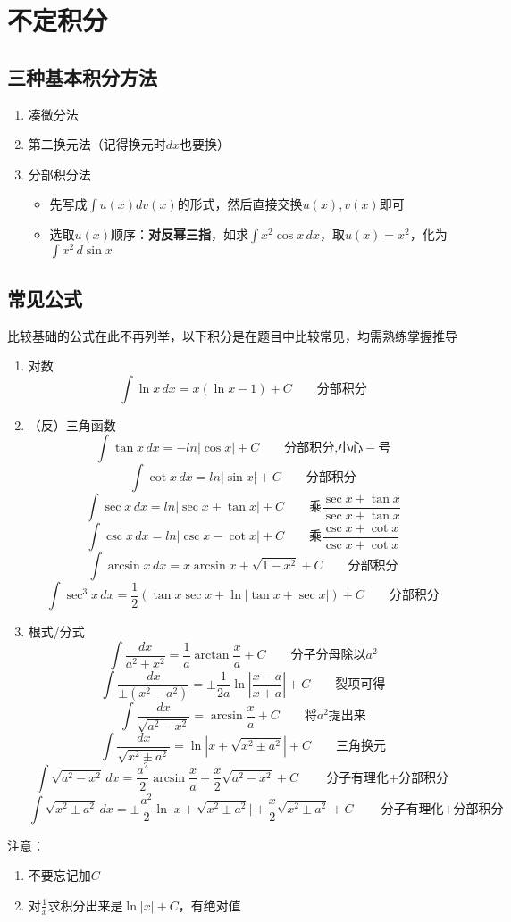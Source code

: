 \section{不定积分}
\subsection{三种基本积分方法}
\begin{enumerate}
	\item 凑微分法
	\item 第二换元法（记得换元时$dx$也要换）
	\item 分部积分法
	\begin{itemize}
		\item 先写成$\displaystyle\int u(x)dv(x)$的形式，然后直接交换$u(x),v(x)$即可
		\item 选取$u(x)$顺序：\textbf{对反幂三指}，如求$\displaystyle\int x^2\cos x\,dx$，取$u(x)=x^2$，化为$\displaystyle\int x^2\,d\sin x$
	\end{itemize}
\end{enumerate}

\subsection{常见公式}
比较基础的公式在此不再列举，以下积分是在题目中比较常见，均需熟练掌握推导
\begin{enumerate}
\item 对数
\[\int \ln x\,dx=x(\ln x-1)+C\qquad\mbox{分部积分}\]
\item （反）三角函数
\[\int \tan x\,dx=-ln|\cos x|+C\qquad\mbox{分部积分,小心}-\mbox{号}\]
\[\int \cot x\,dx=ln|\sin x|+C\qquad\mbox{分部积分}\]
\[\int \sec x\,dx=ln|\sec x+\tan x|+C\qquad\mbox{乘}\frac{\sec x+\tan x}{\sec x+\tan x}\]
\[\int \csc x\,dx=ln|\csc x-\cot x|+C\qquad\mbox{乘}\frac{\csc x+\cot x}{\csc x+\cot x}\]
\[\int \arcsin x\,dx=x\arcsin x+\sqrt{1-x^2}+C\qquad\mbox{分部积分}\]
\[\int \sec^3 x \, dx=\frac{1}{2} (\tan x \sec x+\ln |\tan x+\sec x|)+C\qquad\mbox{分部积分}\]
\item 根式/分式
\[\int \frac{dx}{a^2+x^2}=\frac{1}{a} \arctan\frac{x}{a}+C\qquad\mbox{分子分母除以}a^2\]
\[\int \frac{dx}{\pm(x^2-a^2)}=\pm\frac{1}{2a} \ln|\frac{x-a}{x+a}|+C\qquad\mbox{裂项可得}\]
\[\int \frac{dx}{\sqrt{a^2-x^2}}=\arcsin\frac{x}{a}+C\qquad\mbox{将}a^2\mbox{提出来}\]
\[\int \frac{dx}{\sqrt{x^2\pm a^2}}=\ln|x+\sqrt{x^2\pm a^2}|+C\qquad\mbox{三角换元}\]
\[\int \sqrt{a^2-x^2}\,dx=\frac{a^2}{2}\arcsin\frac{x}{a}+\frac{x}{2}\sqrt{a^2-x^2}+C\qquad\mbox{分子有理化$+$分部积分}\]
\[\int \sqrt{x^2\pm a^2}\,dx=\pm\frac{a^2}{2} \ln\Big|x+\sqrt{x^2\pm a^2}\Big|+\frac{x}{2}\sqrt{x^2\pm a^2}+C\qquad\mbox{分子有理化$+$分部积分}\]
\end{enumerate}
注意：
\begin{enumerate}
\item 不要忘记加$C$
\item 对$\displaystyle \frac{1}{x}$求积分出来是$\ln |x|+C$，有绝对值
\end{enumerate}

